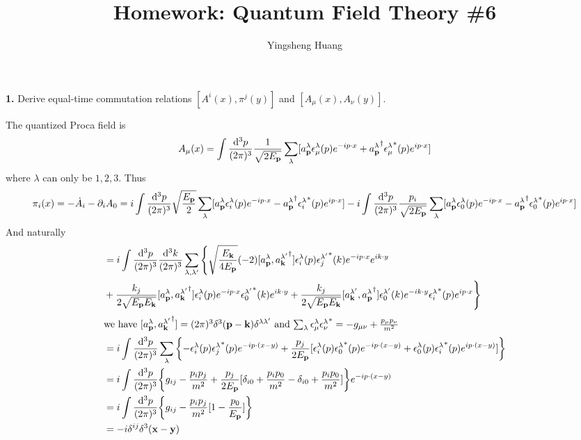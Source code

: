 \documentclass{article}
\title{Homework: Quantum Field Theory \#6}
\author{Yingsheng Huang}
\newcommand{\vbp}{\vb{p}}
\newcommand{\vbk}{\vb{k}}
\newcommand{\la}{\lambda}
\begin{document}
\maketitle
{\bf1.}\quad
Derive equal-time commutation relations $[A^i(x),\pi^j(y)]$ and $[A_{\mu}(x),A_{\nu}(y)]$.

The quantized Proca field is
$$A_{\mu}(x)=\int\frac{\dd^3 p}{(2\pi)^3}\frac{1}{\sqrt{2E_{\vbp}}}\sum_{\lambda}[a^{\la}_{\vbp}\epsilon^{\la}_{\mu}(p)e^{-ip\cdot x}+{a^{\la}_{\vbp}}^{\dagger}{\epsilon^{\la}_{\mu}}^*(p)e^{ip\cdot x}]$$
where $\lambda$ can only be $1,2,3$. Thus
$$\pi_{i}(x)=-\dot{A}_{i}-\partial_iA_0=i\int\frac{\dd^3 p}{(2\pi)^3}\sqrt{\frac{E_{\vbp}}{2}}\sum_{\lambda}[a^{\la}_{\vbp}\epsilon^{\la}_{i}(p)e^{-ip\cdot x}-{a^{\la}_{\vbp}}^{\dagger}{\epsilon^{\la}_{i}}^*(p)e^{ip\cdot x}]-i\int\frac{\dd^3 p}{(2\pi)^3}\frac{p_i}{\sqrt{2E_{\vbp}}}\sum_{\lambda}[a^{\la}_{\vbp}\epsilon^{\la}_{0}(p)e^{-ip\cdot x}-{a^{\la}_{\vbp}}^{\dagger}{\epsilon^{\la}_{0}}^*(p)e^{ip\cdot x}]$$
And naturally
\begin{align*}
  [A^i(x),\pi^j(y)]&=i\int\frac{\dd^3p}{(2\pi)^3}\frac{\dd^3k}{(2\pi)^3}\sum_{\la,\la'}\Bigg\{\sqrt{\frac{E_{\vbk}}{4E_{\vbp}}}(-2)[a^{\la}_{\vbp},{a^{\la'}_{\vbk}}^{\dagger}]\epsilon^{\la}_{i}(p){\epsilon^{\la'}_{j}}^*(k)e^{-ip\cdot x}e^{ik\cdot y}\\
  &+\frac{k_j}{2\sqrt{E_{\vbp}E_{\vbk}}}[a^{\la}_{\vbp},{a^{\la'}_{\vbk}}^{\dagger}]\epsilon^{\la}_{i}(p)e^{-ip\cdot x}{\epsilon_0^{\la'}}^*(k)e^{ik\cdot y}+\frac{k_j}{2\sqrt{E_{\vbp}E_{\vbk}}}[a^{\la'}_{\vbk},{a^{\la}_{\vbp}}^{\dagger}]\epsilon^{\la'}_{0}(k)e^{-ik\cdot y}{\epsilon_{i}^{\la}}^*(p)e^{ip\cdot x}\Bigg\}\\
  \intertext{we have $[a^{\la}_{\vbp},{a^{\la'}_{\vbk}}^{\dagger}]=(2\pi)^3\delta^3(\vbp-\vbk)\delta^{\la\la'}$ and $\sum_{\la}\epsilon_{\mu}^{\la}{\epsilon_{\nu}^{\la}}^*=-g_{\mu\nu}+\frac{p_{\mu}p_{\nu}}{m^2}$}
  &=i\int\frac{\dd^3p}{(2\pi)^3}\sum_{\la}\Bqty{-\epsilon^{\la}_i(p){\epsilon^{\la}_j}^*(p)e^{-ip\cdot{(x-y)}}+\frac{p_j}{2E_{\vbp}}[\epsilon^{\la}_{i}(p){\epsilon^{\la}_0}^*(p)e^{-ip\cdot{(x-y)}}+\epsilon^{\la}_0(p){\epsilon^{\la}_{i}}^*(p)e^{ip\cdot{(x-y)}}]}\\
  &=i\int\frac{\dd^3p}{(2\pi)^3}\Bqty{g_{ij}-\frac{p_ip_j}{m^2}+\frac{p_j}{2E_{\vbp}}[\delta_{i0}+\frac{p_ip_0}{m^2}-\delta_{i0}+\frac{p_ip_0}{m^2}]}e^{-ip\cdot(x-y)}\\
  &=i\int\frac{\dd^3p}{(2\pi)^3}\Bqty{g_{ij}-\frac{p_ip_j}{m^2}[1-\frac{p_0}{E_{\vbp}}]}\\
  &=-i\delta^{ij}\delta^3{(\vb{x-y})}
\end{align*}
\end{document}

